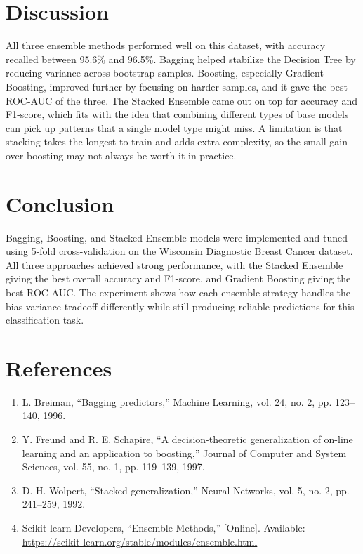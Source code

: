 \documentclass[12pt,a4paper]{article}
\begin{document}
\section{Discussion}
All three ensemble methods performed well on this dataset, with accuracy recalled between 95.6\% and 96.5\%. Bagging helped stabilize the Decision Tree by reducing variance across bootstrap samples. Boosting, especially Gradient Boosting, improved further by focusing on harder samples, and it gave the best ROC-AUC of the three. The Stacked Ensemble came out on top for accuracy and F1-score, which fits with the idea that combining different types of base models can pick up patterns that a single model type might miss. A limitation is that stacking takes the longest to train and adds extra complexity, so the small gain over boosting may not always be worth it in practice.

\section{Conclusion}
Bagging, Boosting, and Stacked Ensemble models were implemented and tuned using 5-fold cross-validation on the Wisconsin Diagnostic Breast Cancer dataset. All three approaches achieved strong performance, with the Stacked Ensemble giving the best overall accuracy and F1-score, and Gradient Boosting giving the best ROC-AUC. The experiment shows how each ensemble strategy handles the bias-variance tradeoff differently while still producing reliable predictions for this classification task.

\section{References}
\begin{enumerate}
\item L. Breiman, ``Bagging predictors,'' Machine Learning, vol. 24, no. 2, pp. 123--140, 1996.
\item Y. Freund and R. E. Schapire, ``A decision-theoretic generalization of on-line learning and an application to boosting,'' Journal of Computer and System Sciences, vol. 55, no. 1, pp. 119--139, 1997.
\item D. H. Wolpert, ``Stacked generalization,'' Neural Networks, vol. 5, no. 2, pp. 241--259, 1992.
\item Scikit-learn Developers, ``Ensemble Methods,'' [Online]. Available: \url{https://scikit-learn.org/stable/modules/ensemble.html}
\end{enumerate}
\end{document}
